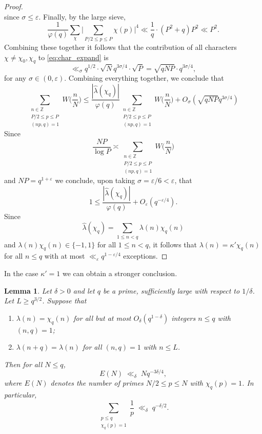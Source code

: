 \documentclass[11pt]{amsart}
\newtheorem{lemma}[theorem]{Lemma}
\begin{document}
\begin{proof}
$$$$
since $\sigma \leq \varepsilon$.
Finally, by the large sieve, 
$$
\frac{1}{\varphi(q)} \sum_{\chi} \Big | \sum_{P/2 \leq p \leq P} \chi(p) \Big |^4 \ll \frac{1}{q} \cdot (P^2 + q) P^2 \ll P^2 . 
$$
Combining these together it follows that the contribution of all characters $\chi \neq \chi_0, \chi_q$ to \eqref{eq:char_expand} is 
$$
\ll_{\sigma} q^{1/2} \cdot \sqrt{N}  q^{3 \sigma / 4} \cdot \sqrt{P}   = \sqrt{q N P} \cdot q^{3 \sigma / 4}, 
$$ 
for any $\sigma \in (0, \varepsilon)$. 
Combining everything together, we conclude that
$$
\sum_{\substack{n \in \mathbb{Z} \\ P/2 \leq p \leq P \\ (n p , q) = 1}} W \Big ( \frac{n}{N} \Big ) \leq  \frac{|\widehat{\lambda}(\chi_q)|}{\varphi(q)}
\sum_{\substack{n \in \mathbb{Z} \\ P/2 \leq p \leq P \\ (np,q)=1}} W \Big ( \frac{n}{N} \Big ) + O_\sigma(\sqrt{q N P} q^{3 \sigma / 4})
$$
Since 
$$
\frac{N P}{\log P} \asymp \sum_{\substack{n \in \mathbb{Z} \\ P/2 \leq p \leq P \\ (np, q) = 1}} W \Big ( \frac{n}{N} \Big )
$$ 
and $N P = q^{1 + \varepsilon}$
we conclude, upon taking $\sigma =  \varepsilon / 6 < \varepsilon$, that
$$
1 \leq \frac{|\widehat{\lambda}(\chi_q)|}{\varphi(q)} + O_{\varepsilon}(q^{- \varepsilon / 4}).
$$ 
Since 
$$
\widehat{\lambda}(\chi_q) = \sum_{1 \leq n < q} \lambda(n) \chi_q(n)
$$
and $\lambda(n) \chi_q(n) \in \{-1, 1\}$ for all $1 \leq n < q$,  
it follows that
$
\lambda(n) = \kappa' \chi_q(n)
$
for all $n \leq q$ with at most $\ll_\varepsilon q^{1 - \varepsilon / 4}$ exceptions. 
\end{proof}

In the case $\kappa' = 1$ we can obtain a stronger conclusion. 

\begin{lemma}\label{lem:exceptional}
Let $\delta > 0$ and let $q$ be a prime, sufficiently large
with respect to $1/\delta$.
Let $L \geq q^{3/2}$.
Suppose that
\begin{enumerate}
\item[\textup{(i)}] $\lambda(n) = \chi_q(n)$ for all but at most
$O_\delta(q^{1-\delta})$ integers $n \leq q$ with $(n,q)=1$;
\item[\textup{(ii)}] $\lambda(n+q) = \lambda(n)$ for all
$(n,q)=1$ with $n \leq L$.
\end{enumerate}
Then for all $N \leq q$, 
\[
E(N) \;\ll_\delta\; N q^{-3\delta/4},
\]
where $E(N)$ denotes the number of primes $N / 2 \leq p \leq N$
with $\chi_q(p)=1$.
In particular,
\[
\sum_{\substack{p \leq q \\ \chi_q(p) =1}}
\frac{1}{p} \;\ll_\delta\; q^{-\delta/2}.
\]
\end{lemma}
\end{document}

